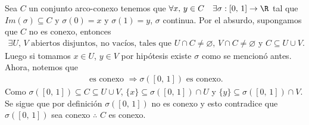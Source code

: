 Sea \( C \) un conjunto arco-conexo tenemos que \( \forall x\text{, }y \in C \quad \exists \sigma : [0\text{, }1] \to \R \) tal que
\( Im(\sigma) \subseteq C \) y \( \sigma(0) = x \) y \( \sigma(1) = y \), \( \sigma \) continua. Por el absurdo, supongamos que \( C \) no es conexo, entonces \begin{align*}
    \exists U\text{, }V \text{ abiertos disjuntos, no vacíos, tales que } U \cap C \neq \varnothing \text{, } V \cap C \neq \varnothing \text{ y } C \subseteq U \cup V\text{.}
\end{align*}
Luego si tomamos \( x \in U \), \( y \in V \) por hipótesis existe \( \sigma \) como se mencionó antes. Ahora, notemos que \begin{align*}
    [0\text{, }1] \text{ es conexo } \Rightarrow \sigma([0\text{, }1]) \text{ es conexo.}
\end{align*}
Como \( \sigma([0\text{, }1]) \subseteq C \subseteq U \cup V \), \( \{ x \} \subseteq \sigma([0\text{, }1]) \cap U \) y \( \{y\} \subseteq \sigma([0\text{, }1]) \cap V \).
Se sigue que por definición \( \sigma([0\text{, }1]) \) no es conexo y esto contradice que \( \sigma([0\text{, }1]) \) sea conexo \( \therefore \) \( C \) es conexo.